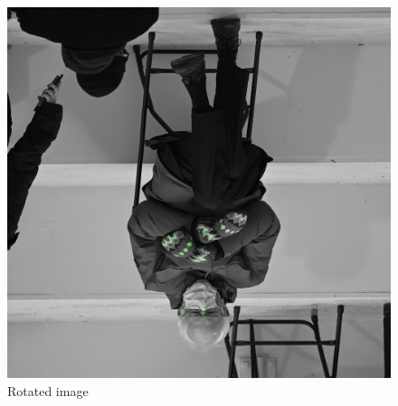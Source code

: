 \documentclass[12pt,a4paper]{report}
\begin{document}
\begin{figure}[hb]
	\centering
	\includegraphics[width=\textwidth]{bernie180.jpg_keypoints}
	\caption{Rotated image}
\end{figure}
\end{document}

